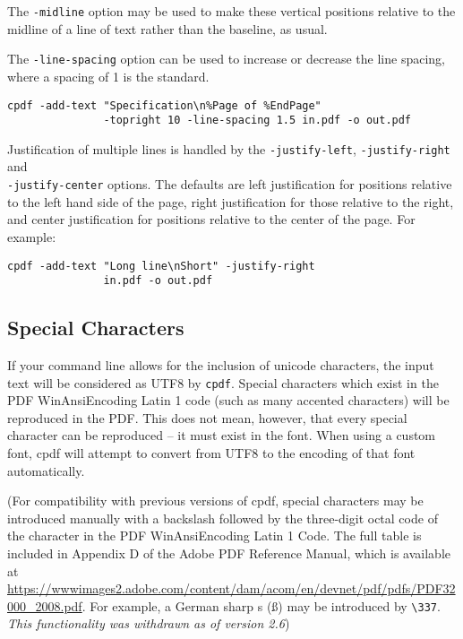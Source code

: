 \documentclass{book}
\begin{document}
\noindent The \texttt{-midline} option may be used to make these vertical positions
relative to the midline of a line of text rather than the baseline, as usual.

The \texttt{-line-spacing} option can be used to increase or decrease the line
spacing, where a spacing of 1 is the standard.

  \begin{framed}
    \small\begin{verbatim}cpdf -add-text "Specification\n%Page of %EndPage"
               -topright 10 -line-spacing 1.5 in.pdf -o out.pdf\end{verbatim}
  \end{framed}

\noindent Justification of multiple lines is handled by the \texttt{-justify-left}, 
\texttt{-justify-right} and\\ \texttt{-justify-center} options. The defaults are
left justification for positions relative to the left hand side of the page,
right justification for those relative to the right, and center justification
for positions relative to the center of the page. For example:

\begin{framed}
  \small\begin{verbatim}cpdf -add-text "Long line\nShort" -justify-right
               in.pdf -o out.pdf\end{verbatim}
\end{framed}

\subsection{Special Characters}

If your command line allows for the inclusion of unicode characters, the input
text will be considered as UTF8 by \verb!cpdf!. Special characters which exist
in the PDF WinAnsiEncoding Latin 1 code (such as many accented characters) will
be reproduced in the PDF. This does not mean, however, that every special
character can be reproduced -- it must exist in the font. When using a custom font, cpdf will attempt to convert from UTF8 to the encoding of that font automatically.

(For compatibility with previous versions of cpdf, special characters may be
introduced manually with a backslash followed by the three-digit octal code of
the character in the PDF WinAnsiEncoding Latin 1 Code. The full table is
included in Appendix D of the Adobe PDF Reference Manual, which is available at
\url{https://wwwimages2.adobe.com/content/dam/acom/en/devnet/pdf/pdfs/PDF32000_2008.pdf}. For example, a German sharp s (\ss) may be introduced by \verb!\337!. \textit{This functionality was withdrawn as of version 2.6})
\end{document}
